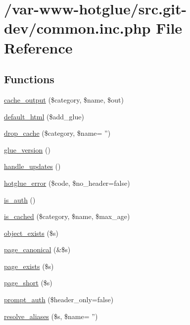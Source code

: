 \hypertarget{common_8inc_8php}{
\section{/var-\/www-\/hotglue/src.git-\/dev/common.inc.php File Reference}
\label{common_8inc_8php}
}
\subsection*{Functions}
\begin{DoxyCompactItemize}
\item 
\hyperlink{common_8inc_8php_a6cceb5c6a3c421c18e925515c78f6dfd}{cache\_\-output} (\$category, \$name, \$out)
\item 
\hyperlink{common_8inc_8php_a8916cb6ec34ceeb3f48c86655c305974}{default\_\-html} (\$add\_\-glue)
\item 
\hyperlink{common_8inc_8php_a29be04ac495441a2d15a99fa6ef63e9d}{drop\_\-cache} (\$category, \$name= '')
\item 
\hyperlink{common_8inc_8php_a0d6d0da45f4adf6283bcccec9fd107e3}{glue\_\-version} ()
\item 
\hyperlink{common_8inc_8php_aa8712e8d1a52e2b8f00ecaf839205d24}{handle\_\-updates} ()
\item 
\hyperlink{common_8inc_8php_a7c4cb31a76aaf90f4399752ef35e00fe}{hotglue\_\-error} (\$code, \$no\_\-header=false)
\item 
\hyperlink{common_8inc_8php_ab3abbb2cd13e01231533e7cdc93da6db}{is\_\-auth} ()
\item 
\hyperlink{common_8inc_8php_a6fb34b9210b43349ca3eb16b2738a28b}{is\_\-cached} (\$category, \$name, \$max\_\-age)
\item 
\hyperlink{common_8inc_8php_a3d71a269e01b98748fb57719feef27be}{object\_\-exists} (\$s)
\item 
\hyperlink{common_8inc_8php_a31ed04b0c90ac3077e71743c307d45f8}{page\_\-canonical} (\&\$s)
\item 
\hyperlink{common_8inc_8php_aa71868111dd5b8af98df9cc9c968e523}{page\_\-exists} (\$s)
\item 
\hyperlink{common_8inc_8php_ada968adfb989aa09adaf29867208f1ab}{page\_\-short} (\$s)
\item 
\hyperlink{common_8inc_8php_a80c23c9d8ac02159151d6368506b1b54}{prompt\_\-auth} (\$header\_\-only=false)
\item 
\hyperlink{common_8inc_8php_a78992fdfae6cd9d7d4e8053d004d1709}{resolve\_\-aliases} (\$s, \$name= '')

\end{DoxyCompactItemize}
